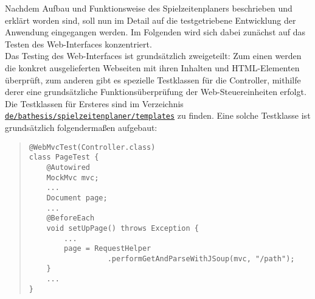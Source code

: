 
Nachdem Aufbau und Funktionsweise des Spielzeitenplaners beschrieben und erklärt 
worden sind, soll nun im Detail auf die testgetriebene Entwicklung der Anwendung 
eingegangen werden. Im Folgenden wird sich dabei zunächst auf das Testen des 
Web-Interfaces konzentriert. \\ 
Das Testing des Web-Interfaces ist grundsätzlich zweigeteilt: Zum einen werden die 
konkret ausgelieferten Webseiten mit ihren Inhalten und HTML-Elementen überprüft, 
zum anderen gibt es spezielle Testklassen für die Controller, mithilfe derer eine 
grundsätzliche Funktionsüberprüfung der Web-Steuereinheiten erfolgt. Die 
Testklassen für Ersteres sind im Verzeichnis \href{https://github.com/FlorianOhmes/bat_spielzeitenplaner/tree/main/spielzeitenplaner/src/test/java/de/bathesis/spielzeitenplaner/templates}{\texttt{de/bathesis/spielzeitenplaner/templates}} zu 
finden. Eine solche Testklasse ist grundsätzlich folgendermaßen aufgebaut: 

\begin{quote}
\begin{verbatim}
@WebMvcTest(Controller.class)
class PageTest {
    @Autowired
    MockMvc mvc;
    ...
    Document page;
    ...
    @BeforeEach
    void setUpPage() throws Exception {
        ...
        page = RequestHelper
                  .performGetAndParseWithJSoup(mvc, "/path");
    }
    ...
}
\end{verbatim}
\end{quote}

